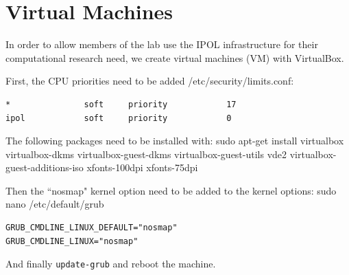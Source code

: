 \documentclass[a4paper,12pt]{article}
\begin{document}

\section{Virtual Machines}
In order to allow members of the lab use the IPOL infrastructure for their computational research need, we create virtual machines (VM) with VirtualBox.

First, the CPU priorities need to be added /etc/security/limits.conf:
\begin{verbatim}
*               soft     priority            17
ipol            soft     priority            0
\end{verbatim}


The following packages need to be installed with: sudo apt-get install virtualbox virtualbox-dkms virtualbox-guest-dkms virtualbox-guest-utils vde2 virtualbox-guest-additions-iso xfonts-100dpi xfonts-75dpi

Then the ``nosmap" kernel option need to be added to the kernel options: sudo nano /etc/default/grub

\begin{verbatim}
GRUB_CMDLINE_LINUX_DEFAULT="nosmap"
GRUB_CMDLINE_LINUX="nosmap"
\end{verbatim}

And finally {\tt update-grub} and reboot the machine.



\end{document}
